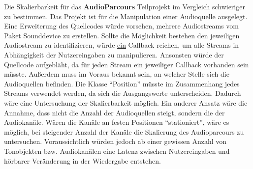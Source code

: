 Die Skalierbarkeit für das \textbf{AudioParcours} Teilprojekt im Vergleich schwieriger zu bestimmen. Das Projekt ist für die Manipulation einer Audioquelle ausgelegt. Eine Erweiterung des Quellcodes würde vorsehen, mehrere Audiostreams vom Paket Sounddevice zu erstellen. Sollte die Möglichkeit bestehen den jeweiligen Audiostream zu identifizieren, würde \underline{ein} Callback reichen, um alle Streams in Abhängigkeit der Nutzereingaben zu manipulieren. Ansonsten würde der Quellcode aufgebläht, da für jeden Stream ein jeweiliger Callback vorhanden sein müsste. Außerdem muss im Voraus bekannt sein, an welcher Stelle sich die Audioquellen befinden. Die Klasse \enquote{Position} müsste im Zusammenhang jedes Streams verwendet werden, da sich die Ausgangswerte unterscheiden. Dadurch wäre eine Untersuchung der Skalierbarkeit möglich. Ein anderer Ansatz wäre die Annahme, dass nicht die Anzahl der Audioquellen steigt, sondern die der Audiokanäle. Wären die Kanäle an festen Positionen \enquote{stationiert}, wäre es möglich, bei steigender Anzahl der Kanäle die Skalierung des Audioparcours zu untersuchen. Voraussichtlich würden jedoch ab einer gewissen Anzahl von Tonobjekten bzw. Audiokanälen eine Latenz zwischen Nutzereingaben und hörbarer Veränderung in der Wiedergabe entstehen. 